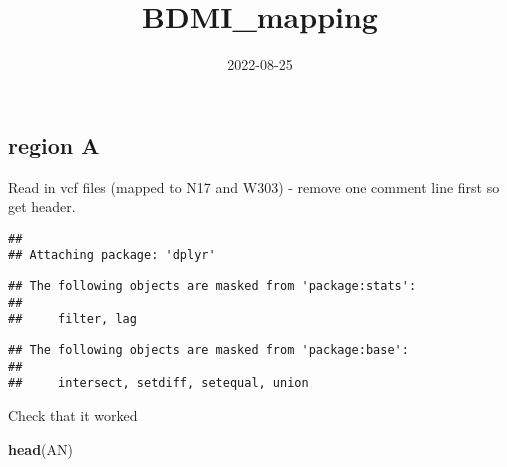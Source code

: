 \documentclass[
]{article}
\title{BDMI\_mapping}
\author{}
\date{\vspace{-2.5em}2022-08-25}
\newenvironment{Shaded}{\begin{snugshade}}{\end{snugshade}}
\newcommand{\FunctionTok}[1]{\textcolor[rgb]{0.13,0.29,0.53}{\textbf{#1}}}
\newcommand{\NormalTok}[1]{#1}
\begin{document}
\maketitle

\hypertarget{region-a}{%
\subsection{region A}\label{region-a}}

Read in vcf files (mapped to N17 and W303) - remove one comment line
first so get header.

\begin{verbatim}
## 
## Attaching package: 'dplyr'
\end{verbatim}

\begin{verbatim}
## The following objects are masked from 'package:stats':
## 
##     filter, lag
\end{verbatim}

\begin{verbatim}
## The following objects are masked from 'package:base':
## 
##     intersect, setdiff, setequal, union
\end{verbatim}

Check that it worked

\begin{Shaded}
\begin{Highlighting}[]
\FunctionTok{head}\NormalTok{(AN)}
\end{Highlighting}
\end{Shaded}
\end{document}
